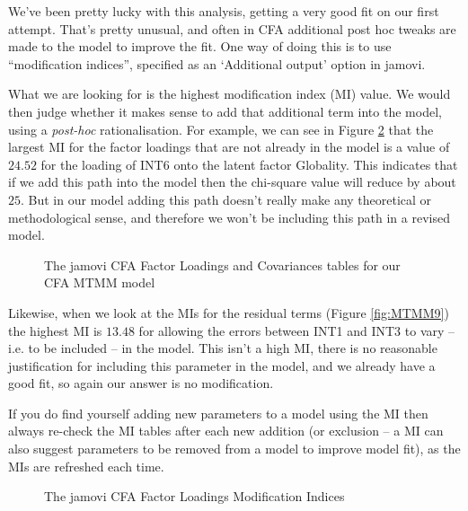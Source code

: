 We’ve been pretty lucky with this analysis, getting a very good fit on our first attempt. That’s pretty unusual, and often in CFA additional post hoc tweaks are made to the model to improve the fit. One way of doing this is to use “modification indices”, specified as an ‘Additional output’ option in jamovi.


What we are looking for is the highest modification index (MI) value. We would then judge whether it makes sense to add that additional term into the model, using a {\it post-hoc} rationalisation. For example, we can see in Figure \ref{fig:MTMM8} that the largest MI for the factor loadings that are not already in the model is a value of $24.52$ for the loading of INT6 onto the latent factor Globality. This indicates that if we add this path into the model then the chi-square value will reduce by about $25$. But in our model adding this path doesn't really make any theoretical or methodological sense, and therefore we won’t be including this path in a revised model.

\begin{figure}[!htb]
\begin{center}
\caption{The jamovi CFA Factor Loadings and Covariances tables for our CFA MTMM model}
\label{fig:MTMM7}
\HR
\end{center}
\end{figure}

Likewise, when we look at the MIs for the residual terms (Figure \ref{fig:MTMM9}) the highest MI is $13.48$ for allowing the errors between INT1 and INT3 to vary – i.e. to be included – in the model. This isn’t a high MI, there is no reasonable justification for including this parameter in the model, and we already have a good fit, so again our answer is no modification.

If you do find yourself adding new parameters to a model using the MI then always re-check the MI tables after each new addition (or exclusion – a MI can also suggest parameters to be removed from a model to improve model fit), as the MIs are refreshed each time.

\begin{figure}[!htb]
\begin{center}
\caption{The jamovi CFA Factor Loadings Modification Indices}
\label{fig:MTMM8}
\HR
\end{center}
\end{figure}

